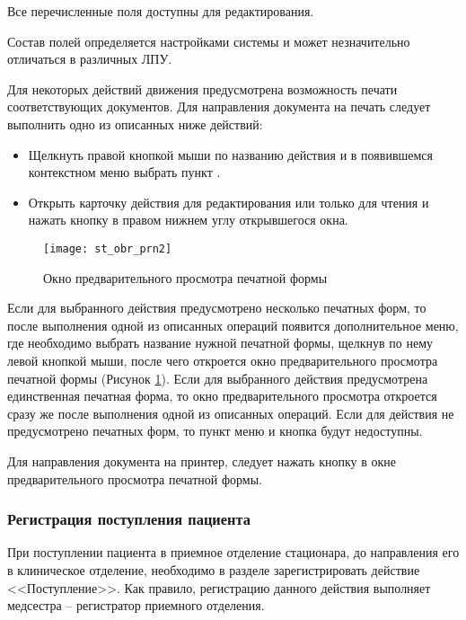 Все перечисленные поля доступны для редактирования.

Состав полей определяется настройками системы и может незначительно отличаться в различных ЛПУ.

Для некоторых действий движения предусмотрена возможность печати соответствующих документов. Для направления документа на печать следует выполнить одно из описанных ниже действий:
\begin{itemize}
 \item Щелкнуть правой кнопкой мыши по названию действия и в появившемся контекстном меню выбрать пункт .
 \item Открыть карточку действия для редактирования или только для чтения и нажать кнопку  в правом нижнем углу открывшегося окна.
\end{itemize}

\begin{figure}[ht!]\centering
   \texttt{[image: st\_obr\_prn2]}
   \caption{Окно предварительного просмотра печатной формы}
   \label{img_st_obr_prn2}
\end{figure}
 
Если для выбранного действия предусмотрено несколько печатных форм, то после выполнения одной из описанных операций появится дополнительное меню, где необходимо выбрать название нужной печатной формы, щелкнув по нему левой кнопкой мыши, после чего откроется окно предварительного просмотра печатной формы (Рисунок \ref{img_st_obr_prn2}). Если для выбранного действия предусмотрена единственная печатная форма, то окно предварительного просмотра откроется сразу же после выполнения одной из описанных операций. Если для действия не предусмотрено печатных форм, то пункт меню  и кнопка  будут недоступны.

Для направления документа на принтер, следует нажать кнопку  в окне предварительного просмотра печатной формы.

\subsubsection{Регистрация поступления пациента}

При поступлении пациента в приемное отделение стационара, до направления его в клиническое отделение, необходимо в разделе  зарегистрировать действие <<Поступление>>. Как правило, регистрацию данного действия выполняет медсестра – регистратор приемного отделения.

